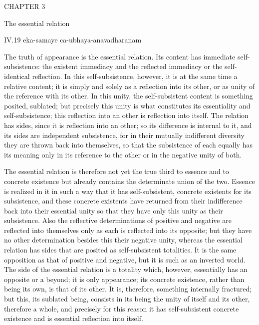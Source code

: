 CHAPTER 3

The essential relation

IV.19
eka-samaye ca-ubhaya-anavadharanam

The truth of appearance is the essential relation.
Its content has immediate self-subsistence:
the existent immediacy and the reflected immediacy
or the self-identical reflection.
In this self-subsistence, however,
it is at the same time a relative content;
it is simply and solely as a reflection into its other,
or as unity of the reference with its other.
In this unity, the self-subsistent content is
something posited, sublated;
but precisely this unity is what constitutes
its essentiality and self-subsistence;
this reflection into an other is reflection into itself.
The relation has sides, since it is reflection into an other;
so its difference is internal to it,
and its sides are independent subsistence,
for in their mutually indifferent diversity
they are thrown back into themselves,
so that the subsistence of each equally has its meaning
only in its reference to the other
or in the negative unity of both.

The essential relation is therefore not yet
the true third to essence and to concrete existence
but already contains the determinate union of the two.
Essence is realized in it in such a way that
it has self-subsistent, concrete existents for its subsistence,
and these concrete existents have returned
from their indifference back into their essential unity
so that they have only this unity as their subsistence.
Also the reflective determinations
of positive and negative are
reflected into themselves only as
each is reflected into its opposite;
but they have no other determination
besides this their negative unity,
whereas the essential relation has sides
that are posited as self-subsistent totalities.
It is the same opposition as that of positive and negative,
but it is such as an inverted world.
The side of the essential relation is a totality
which, however, essentially has an opposite or a beyond;
it is only appearance;
its concrete existence,
rather than being its own,
is that of its other.
It is, therefore, something internally fractured;
but this, its sublated being, consists in
its being the unity of itself and its other,
therefore a whole, and precisely for this reason
it has self-subsistent concrete existence
and is essential reflection into itself.


